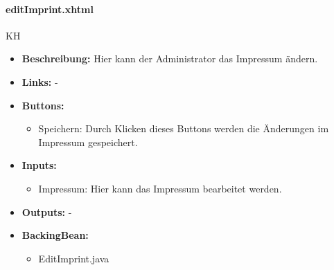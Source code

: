 				\paragraph{editImprint.xhtml}
					KH\\
					\begin{itemize}
						\item \textbf{Beschreibung:} Hier kann der Administrator das Impressum ändern.
						\item \textbf{Links:} -
						\item \textbf{Buttons:}
							\begin{itemize}
								\item Speichern: Durch Klicken dieses Buttons werden die Änderungen im Impressum gespeichert.
							\end{itemize}
						\item \textbf{Inputs:}
							\begin{itemize}
								\item Impressum: Hier kann das Impressum bearbeitet werden.
							\end{itemize}
						\item \textbf{Outputs:} -
						\item \textbf{BackingBean:}
							\begin{itemize}
								\item EditImprint.java				
							\end{itemize}
					\end{itemize}
				
